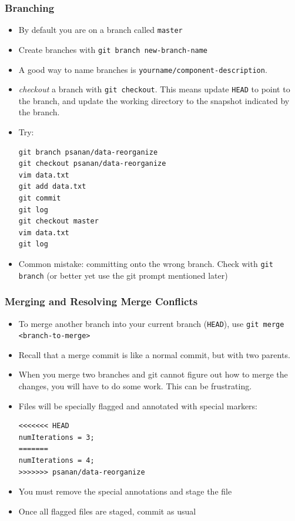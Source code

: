 \documentclass{beamer}
\begin{document}
\begin{frame}[fragile]
\frametitle{Branching}
\begin{itemize}
\item By default you are on a branch called \texttt{master}
\item Create branches with \lstinline{git branch new-branch-name}
\item A good way to name branches is \lstinline{yourname/component-description}.
\item \emph{checkout} a branch with \lstinline{git checkout}. This means update \texttt{HEAD} to point to the branch, and update the working directory to the snapshot indicated by the branch.
\item Try:
\begin{lstlisting}
git branch psanan/data-reorganize
git checkout psanan/data-reorganize
vim data.txt
git add data.txt
git commit
git log
git checkout master
vim data.txt
git log
\end{lstlisting}
\item Common mistake: committing onto the wrong branch. Check with \lstinline{git branch} (or better yet use the git prompt mentioned later)
\end{itemize}
\end{frame}

\begin{frame}[fragile]
\frametitle{Merging and Resolving Merge Conflicts}
\begin{itemize}
\item To merge another branch into your current branch (\texttt{HEAD}), use \lstinline{git merge <branch-to-merge>}
\item Recall that a merge commit is like a normal commit, but with two parents.
\item When you merge two branches and git cannot figure out how to merge the changes, you will have to do some work. This can be frustrating.
\item Files will be specially flagged and annotated with special markers:
\begin{verbatim}
<<<<<<< HEAD
numIterations = 3;
=======
numIterations = 4;
>>>>>>> psanan/data-reorganize
\end{verbatim}
\item You must remove the special annotations and stage the file
\item Once all flagged files are staged, commit as usual
\end{itemize}
\end{frame}
\end{document}
